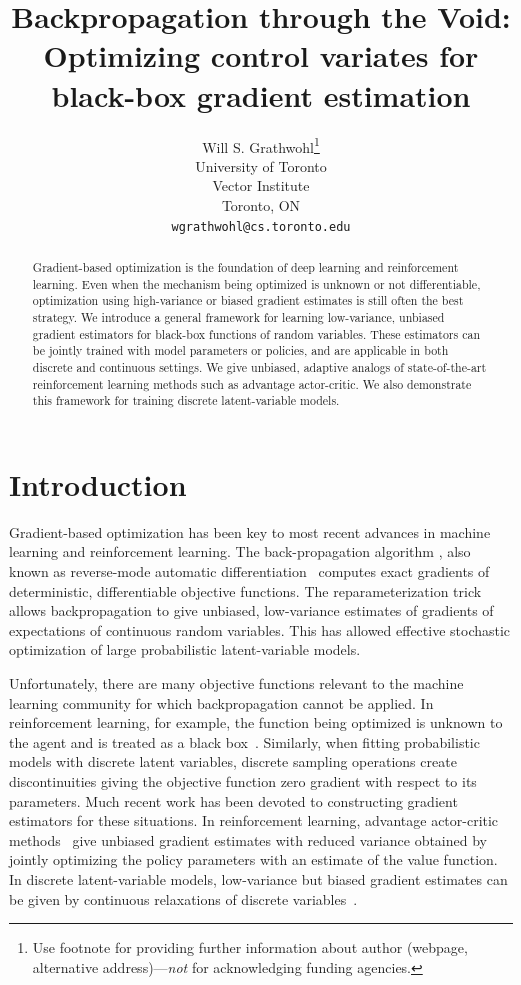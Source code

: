 \documentclass{article}
\title{Backpropagation through the Void:\\
Optimizing control variates for \\ black-box gradient estimation}
\author{
  Will S. Grathwohl\thanks{Use footnote for providing further
    information about author (webpage, alternative
    address)---\emph{not} for acknowledging funding agencies.} \\
  University of Toronto\\
  Vector Institute\\
  Toronto, ON \\
  \texttt{wgrathwohl@cs.toronto.edu} \\
}
\begin{document}
\maketitle
\begin{abstract}
Gradient-based optimization is the foundation of deep learning and reinforcement learning.
Even when the mechanism being optimized is unknown or not differentiable, optimization using high-variance or biased gradient estimates is still often the best strategy.
We introduce a general framework for learning low-variance, unbiased gradient estimators for black-box functions of random variables.
These estimators can be jointly trained with model parameters or policies, and are applicable in both discrete and continuous settings.
We give unbiased, adaptive analogs of state-of-the-art reinforcement learning methods such as advantage actor-critic.
We also demonstrate this framework for training discrete latent-variable models.
\end{abstract}


\section{Introduction}
Gradient-based optimization has been key to most recent advances in machine learning and reinforcement learning.
The back-propagation algorithm \citep{rumelhart1986learning}, also known as reverse-mode automatic differentiation~\citep{speelpenning1980compiling, rall1981automatic} computes exact gradients of deterministic, differentiable objective functions.
The reparameterization trick \citep{williams1992simple, kingma2013autoencoding, rezende2014stochastic} allows backpropagation to give unbiased, low-variance estimates of gradients of expectations of continuous random variables.
This has allowed effective stochastic optimization of large probabilistic latent-variable models.

Unfortunately, there are many objective functions relevant to the machine learning community for which backpropagation cannot be applied. In reinforcement learning, for example, the function being optimized is unknown to the agent and is treated as a black box~\citep{schulman2015gradient}. Similarly, when fitting probabilistic models with discrete latent variables, discrete sampling operations create discontinuities giving the objective function zero gradient with respect to its parameters.
Much recent work has been devoted to constructing gradient estimators for these situations.
In reinforcement learning, advantage actor-critic methods~\citep{sutton2000policy} give unbiased gradient estimates with reduced variance obtained by jointly optimizing the policy parameters with an estimate of the value function.
In discrete latent-variable models, low-variance but biased gradient estimates can be given by continuous relaxations of discrete variables~\citep{maddison2016concrete, jang2016categorical}.
\end{document}
